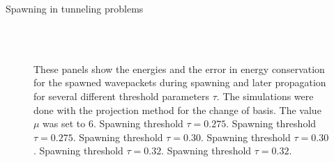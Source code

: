 \begin{chapter}{Spawning in tunneling problems}
\begin{figure}[h!]
{  } \\
   \\
  \caption[Energies and energy drift of the spawned wavepackets during spawning and later propagation]{
  These panels show the energies and the error in energy conservation for the spawned wavepackets
  during spawning and later propagation for several different threshold parameters $\tau$.
  The simulations were done with the projection method for the change of basis. The value $\mu$ was set to 6.
   Spawning threshold $\tau = 0.275$.
   Spawning threshold $\tau = 0.275$.
   Spawning threshold $\tau = 0.30$.
   Spawning threshold $\tau = 0.30$.
   Spawning threshold $\tau = 0.32$.
   Spawning threshold $\tau = 0.32$.
  \label{fig:spawn_propag_project_K100_bs6_energies}
  }
\end{figure}



\end{chapter}
